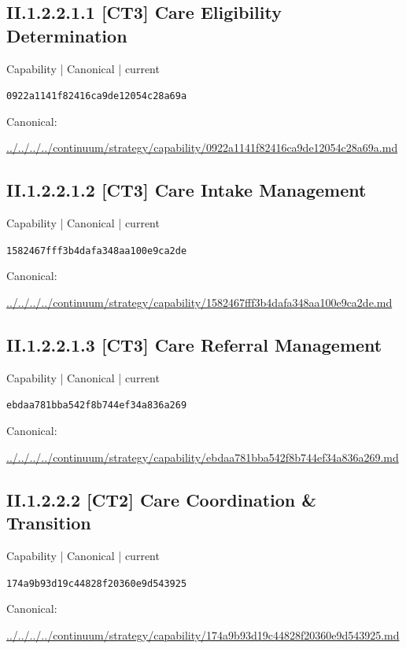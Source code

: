 \documentclass[10pt,a4paper]{article}
\begin{document}
\subsection*{II.1.2.2.1.1 [CT3] Care Eligibility Determination}
{\small Capability | Canonical | current}\par
\texttt{0922a1141f82416ca9de12054c28a69a}\par
Canonical: \par
{\footnotesize\url{../../../../continuum/strategy/capability/0922a1141f82416ca9de12054c28a69a.md}}\par
\subsection*{II.1.2.2.1.2 [CT3] Care Intake Management}
{\small Capability | Canonical | current}\par
\texttt{1582467fff3b4dafa348aa100e9ca2de}\par
Canonical: \par
{\footnotesize\url{../../../../continuum/strategy/capability/1582467fff3b4dafa348aa100e9ca2de.md}}\par
\subsection*{II.1.2.2.1.3 [CT3] Care Referral Management}
{\small Capability | Canonical | current}\par
\texttt{ebdaa781bba542f8b744ef34a836a269}\par
Canonical: \par
{\footnotesize\url{../../../../continuum/strategy/capability/ebdaa781bba542f8b744ef34a836a269.md}}\par
\subsection*{II.1.2.2.2 [CT2] Care Coordination \& Transition}
{\small Capability | Canonical | current}\par
\texttt{174a9b93d19c44828f20360e9d543925}\par
Canonical: \par
{\footnotesize\url{../../../../continuum/strategy/capability/174a9b93d19c44828f20360e9d543925.md}}\par
\end{document}
